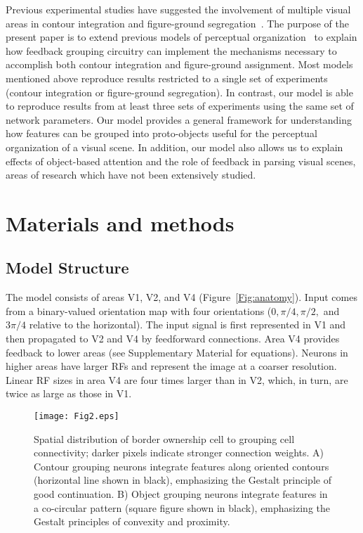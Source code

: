 Previous experimental studies have suggested the involvement of
multiple visual areas in contour integration and figure-ground
segregation~\citep{Poort_etal12,Chen_etal14}.  The purpose of the
present paper is to extend previous models of perceptual
organization~\citep{Craft_etal07,Mihalas_etal11b} to explain how
feedback grouping circuitry can implement the mechanisms necessary to
accomplish both contour integration and figure-ground assignment.
Most models mentioned above reproduce results restricted to a single
set of experiments (\eg contour integration or figure-ground
segregation). In contrast, our model is able to reproduce results from
at least three sets of experiments using the same set of network
parameters. Our model provides a general framework for understanding
how features can be grouped into proto-objects useful for the
perceptual organization of a visual scene. In addition, our model also
allows us to explain effects of object-based attention and the role of
feedback in parsing visual scenes, areas of research which have not
been extensively studied.

\section{Materials and methods} 
\label{sec:model}
\subsection{Model Structure}

The model consists of areas V1, V2, and V4
(Figure~\ref{Fig:anatomy}). Input comes from a
binary-valued orientation map with four orientations
($0, \pi/4, \pi/2,$ and $3\pi/4$ relative to the horizontal). The
input signal is first represented in V1 and then propagated to V2 and
V4 by feedforward connections. Area V4 provides feedback to lower
areas (see Supplementary Material for equations). Neurons in higher
areas have larger RFs and represent the image at a coarser
resolution. Linear RF sizes in area V4 are four times larger than 
in V2, which, in turn, are twice as large as those in V1.

\begin{figure*}
\begin{center}
\texttt{[image: Fig2.eps]}
\end{center}
\caption{Spatial distribution of border ownership cell to grouping
  cell connectivity; darker pixels indicate stronger connection
  weights. A) Contour grouping neurons integrate features along
  oriented contours (horizontal line shown in black), emphasizing the
  Gestalt principle of good continuation. B) Object grouping neurons
  integrate features in a co-circular pattern (square figure shown in
  black), emphasizing the Gestalt principles of convexity and
  proximity.} 
\label{Fig:BG_projections}
\end{figure*}

